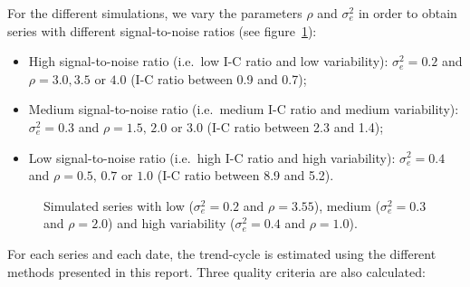 \documentclass[
]{article}
\newcommand\1{\mathds{1}}
\begin{document}
For the different simulations, we vary the parameters \(\rho\) and
\(\sigma_e^2\) in order to obtain series with different signal-to-noise
ratios (see figure~\ref{fig-graphs-data-simul}):

\begin{itemize}
\item
  High signal-to-noise ratio (i.e.~low I-C ratio and low variability):
  \(\sigma_e^2=0.2\) and \(\rho = 3.0, 3.5\) or \(4.0\) (I-C ratio
  between 0.9 and 0.7);
\item
  Medium signal-to-noise ratio (i.e.~medium I-C ratio and medium
  variability): \(\sigma_e^2=0.3\) and \(\rho = 1.5,\, 2.0\) or \(3.0\)
  (I-C ratio between 2.3 and 1.4);
\item
  Low signal-to-noise ratio (i.e.~high I-C ratio and high variability):
  \(\sigma_e^2=0.4\) and \(\rho = 0.5,\, 0.7\) or \(1.0\) (I-C ratio
  between 8.9 and 5.2).
\end{itemize}

\begin{figure}[H]

\caption{\label{fig-graphs-data-simul}Simulated series with low
(\(\sigma_e^2=0.2\) and \(\rho = 3.55\)), medium (\(\sigma_e^2=0.3\) and
\(\rho = 2.0\)) and high variability (\(\sigma_e^2=0.4\) and
\(\rho = 1.0\)).}


\end{figure}%

For each series and each date, the trend-cycle is estimated using the
different methods presented in this report. Three quality criteria are
also calculated:
\end{document}
